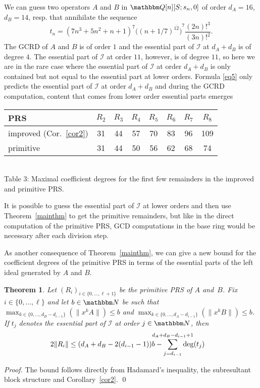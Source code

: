 \documentclass[3p,11pt,preprint]{elsarticle}
\newtheorem{theorem}{Theorem}
\let\set\mathbbm
\newcommand{\D}{x}
\newcommand{\prs}[3]{(#1_i)_{i\in \{#2,\dots,#3\}}}
\begin{document}
\begin{example}
 We can guess two operators $A$ and $B$ in $\set Q[n][S;s_n,0]$ of order $d_A=16$, $d_B=14$, resp. that annihilate the sequence
\[t_n = (7n^3+5n^2+n+1)^7({(n+1/7)^{\overline{12}})}^7\frac{(2n)!^3}{(3n)!^2}.\]
The GCRD of $A$ and $B$ is of order $1$ and the essential part of $\mathcal{I}$ at $d_A+d_B$ is of degree $4$. The essential part of $\mathcal{I}$ at order $11$, however, is of degree $11$, so here we are in the rare case where the essential part of $\mathcal{I}$ at order $d_A+d_B$ is only contained but not equal to the essential part at lower orders. Formula \eqref{eq5} only predicts the essential part of $\mathcal{I}$ at order  $d_A+d_B$ and during the GCRD computation, content that comes from lower order essential parts emerges
 \begin{center}
\begin{tabular}{l|c|c|c|c|c|c|c}
PRS & $R_2$ & $R_3$ & $R_4$ & $R_5$ & $R_6$ & $R_7$ & $R_8$\\
\hline
 improved (Cor.~\ref{cor2})& 31 & 44 & 57 & 70 & 83 & 96 & 109 \rlap{\quad}\\
\hline 
 primitive & 31 & 44 & 50 & 56 & 62 & 68 & 74\\
\end{tabular}\\
{\vspace{0.1cm}\scriptsize{Table 3: Maximal coefficient degrees for the first few remainders in the improved and primitive PRS.}}
\end{center}
It is possible to guess the essential part of $\mathcal{I}$ at lower orders and then use Theorem~\ref{mainthm} to get the primitive remainders, but like in the direct computation of the primitive PRS, GCD computations in the base ring would be necessary after each division step.
\end{example}


 As another consequence of Theorem~\ref{mainthm}, we can give a new bound for the coefficient degrees of the primitive PRS in terms of the essential parts of the left ideal generated by $A$ and $B$. 
 \begin{theorem}
  Let $\prs{R}{0}{\ell+1}$ be the primitive PRS of $A$ and~$B$. Fix $i\in\{0,\dots,\ell\}$ and let $b\in\set N$ be such that $\max_{k\in\{0,\dots,d_B-d_{i-1}\}}(\lVert\D^kA\rVert)\leq b$ and $\max_{k\in\{0,\dots,d_A-d_{i-1}\}}(\lVert \D^kB\rVert)\leq b$. If $t_j$ denotes the essential part of $\mathcal{I}$ at order $j\in\set N$, then
  \begin{alignat*}2
   \lVert R_i\rVert & \leq (d_A+d_B-2(d_{i-1}-1))b - \sum_{j=d_{i-1}}^{\mathclap{d_A+d_B-d_{i-1}+1}}{\deg(t_j)}
\end{alignat*}
 \end{theorem}
\begin{proof}
 The bound follows directly from Hadamard's inequality, the subresultant block structure and Corollary~\ref{cor2}. \qed
\end{proof}
\end{document}
